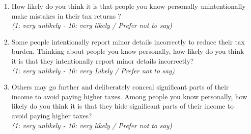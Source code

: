 \documentclass[11pt]{article}
\begin{document}
\begin{enumerate}[resume]
    \item How likely do you think it is that people you know personally unintentionally make mistakes in their tax returns ? \\
    \textit{(1: very unlikely - 10: very likely / Prefer not to say)}
    \item Some people intentionally report minor details incorrectly to reduce their tax burden. Thinking about people you know personally, how likely do you think it is that they intentionally report minor details incorrectly?\\
    \textit{(1: very unlikely - 10: very Likely / Prefer not to say)}
    \item Others may go further and deliberately conceal significant parts of their income to avoid paying higher taxes. Among people you know personally, how likely do you think it is that they hide significant parts of their income to avoid paying higher taxes?\\
    \textit{(1: very unlikely - 10: very likely / Prefer not to say)}
\end{enumerate}
\end{document}
